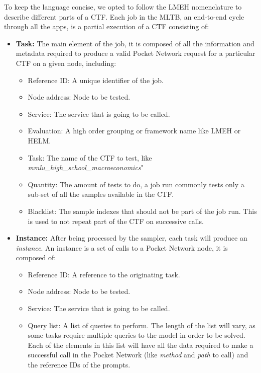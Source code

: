 To keep the language concise, we opted to follow the \gls{LMEH} nomenclature to describe different parts of a \gls{CTF}. Each job in the \gls{MLTB}, an end-to-end cycle through all the apps, is a partial execution of a \gls{CTF} consisting of:
\begin{itemize}
    \item \textbf{Task:} The main element of the job, it is composed of all the information and metadata required to produce a valid Pocket Network request for a particular \gls{CTF} on a given node, including:
    \begin{itemize}
        \item Reference ID: A unique identifier of the job.
        \item Node address: Node to be tested.
        \item Service: The service that is going to be called.
        \item Evaluation: A high order grouping or framework name like \gls{LMEH} or \gls{HELM}.
        \item Task: The name of the \gls{CTF} to test, like \emph{mmlu\_high\_school\_macroeconomics}"
        \item Quantity: The amount of tests to do, a job run commonly tests only a sub-set of all the samples available in the \gls{CTF}.
        \item Blacklist: The sample indexes that should not be part of the job run. This is used to not repeat part of the \gls{CTF} on successive calls.
    \end{itemize}
    \item \textbf{Instance:} After being processed by the sampler, each task will produce an \emph{instance}. An instance is a set of calls to a Pocket Network node, it is composed of:
    \begin{itemize}
        \item Reference ID: A reference to the originating task.
        \item Node address: Node to be tested.
        \item Service: The service that is going to be called.
        \item Query list: A list of queries to perform. The length of the list will vary, as some tasks require multiple queries to the model in order to be solved. Each of the elements in this list will have all the data required to make a successful call in the Pocket Network (like \emph{method} and \emph{path} to call) and the reference IDs of the prompts.
    \end{itemize}

\end{itemize}
